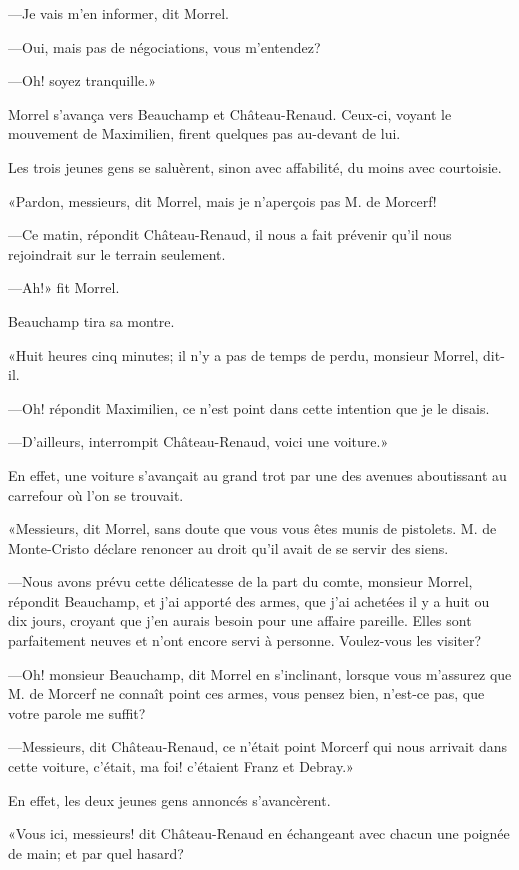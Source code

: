 —Je vais m'en informer, dit Morrel. 

—Oui, mais pas de négociations, vous m'entendez? 

—Oh! soyez tranquille.» 

Morrel s'avança vers Beauchamp et Château-Renaud. Ceux-ci, voyant le mouvement de Maximilien, firent quelques pas au-devant de lui. 

Les trois jeunes gens se saluèrent, sinon avec affabilité, du moins avec courtoisie. 

«Pardon, messieurs, dit Morrel, mais je n'aperçois pas M. de Morcerf! 

—Ce matin, répondit Château-Renaud, il nous a fait prévenir qu'il nous rejoindrait sur le terrain seulement. 

—Ah!» fit Morrel. 

Beauchamp tira sa montre. 

«Huit heures cinq minutes; il n'y a pas de temps de perdu, monsieur Morrel, dit-il. 

—Oh! répondit Maximilien, ce n'est point dans cette intention que je le disais. 

—D'ailleurs, interrompit Château-Renaud, voici une voiture.» 

En effet, une voiture s'avançait au grand trot par une des avenues aboutissant au carrefour où l'on se trouvait. 

«Messieurs, dit Morrel, sans doute que vous vous êtes munis de pistolets. M. de Monte-Cristo déclare renoncer au droit qu'il avait de se servir des siens. 

—Nous avons prévu cette délicatesse de la part du comte, monsieur Morrel, répondit Beauchamp, et j'ai apporté des armes, que j'ai achetées il y a huit ou dix jours, croyant que j'en aurais besoin pour une affaire pareille. Elles sont parfaitement neuves et n'ont encore servi à personne. Voulez-vous les visiter? 

—Oh! monsieur Beauchamp, dit Morrel en s'inclinant, lorsque vous m'assurez que M. de Morcerf ne connaît point ces armes, vous pensez bien, n'est-ce pas, que votre parole me suffit? 

—Messieurs, dit Château-Renaud, ce n'était point Morcerf qui nous arrivait dans cette voiture, c'était, ma foi! c'étaient Franz et Debray.» 

En effet, les deux jeunes gens annoncés s'avancèrent. 

«Vous ici, messieurs! dit Château-Renaud en échangeant avec chacun une poignée de main; et par quel hasard? 

